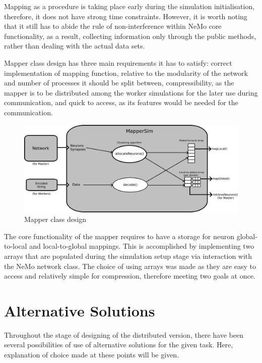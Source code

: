 Mapping as a procedure is taking place early during the simulation initialisation, therefore, it does not have strong time constraints. However, it is worth noting that it still has to abide the rule of non-interference within NeMo core functionality, as a result, collecting information only through the public methods, rather than dealing with the actual data sets.

Mapper class design has three main requirements it has to satisfy: correct implementation of mapping function, relative to the modularity of the network and number of processes it should be split between, compressibility, as the mapper is to be distributed among the worker simulations for the later use during communication, and quick to access, as its features would be needed for the communication.

\begin{figure}[h]
\begin{center}
\includegraphics[scale = 0.4]{images/mapper_design.png}
\end{center}
\caption{Mapper class design}
\end{figure}

The core functionality of the mapper requires to have a storage for neuron global-to-local and local-to-global mappings. This is accomplished by implementing two arrays that are populated during the simulation setup stage via interaction with the NeMo network class. The choice of using arrays was made as they are easy to access and relatively simple for compression, therefore meeting two goals at once.

\section{Alternative Solutions}

Throughout the stage of designing of the distributed version, there have been several possibilities of use of alternative solutions for the given task. Here, explanation of choice made at these points will be given.

